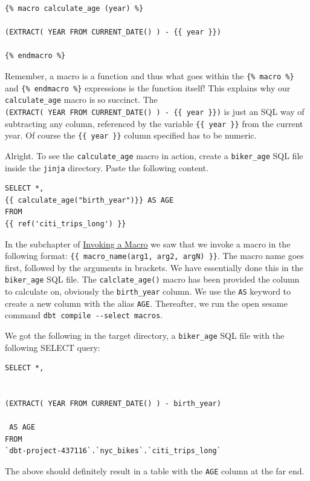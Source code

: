 \documentclass[
]{book}
\begin{document}
\begin{verbatim}
{% macro calculate_age (year) %}

(EXTRACT( YEAR FROM CURRENT_DATE() ) - {{ year }}) 

{% endmacro %}
\end{verbatim}

Remember, a macro is a function and thus what goes within the \texttt{\{\%\ macro\ \%\}} and \texttt{\{\%\ endmacro\ \%\}} expressions is the function itself! This explains why our \texttt{calculate\_age} macro is so succinct. The \texttt{(EXTRACT(\ YEAR\ FROM\ CURRENT\_DATE()\ )\ -\ \{\{\ year\ \}\})} is just an SQL way of subtracting any column, referenced by the variable \texttt{\{\{\ year\ \}\}} from the current year. Of course the \texttt{\{\{\ year\ \}\}} column specified has to be numeric.

Alright. To see the \texttt{calculate\_age} macro in action, create a \texttt{biker\_age} SQL file inside the \texttt{jinja} directory. Paste the following content.

\begin{verbatim}
SELECT *, 
{{ calculate_age("birth_year")}} AS AGE
FROM 
{{ ref('citi_trips_long') }}
\end{verbatim}

In the subchapter of \protect\hyperlink{ux5cux23Invokingux5cux2520aux5cux2520macro}{Invoking a Macro} we saw that we invoke a macro in the following format: \texttt{\{\{\ macro\_name(arg1,\ arg2,\ argN)\ \}\}}. The macro name goes first, followed by the arguments in brackets. We have essentially done this in the \texttt{biker\_age} SQL file. The \texttt{calclate\_age()} macro has been provided the column to calculate on, obviously the \texttt{birth\_year} column. We use the \texttt{AS} keyword to create a new column with the alias \texttt{AGE}. Thereafter, we run the open sesame command \texttt{dbt\ compile\ -\/-select\ macros}.

We got the following in the target directory, a \texttt{biker\_age} SQL file with the following SELECT query:

\begin{verbatim}
SELECT *, 


(EXTRACT( YEAR FROM CURRENT_DATE() ) - birth_year) 

 AS AGE
FROM 
`dbt-project-437116`.`nyc_bikes`.`citi_trips_long`
\end{verbatim}

The above should definitely result in a table with the \texttt{AGE} column at the far end.
\end{document}
